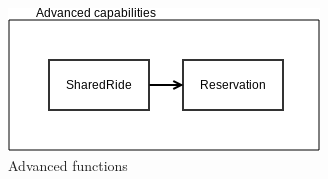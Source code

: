 \begin{figure} [h]
  \centering
  \includegraphics[scale=0.72]{diagrams/point 7.png}
  \caption{\label{fig:adv_func} Advanced functions}
\end{figure}



